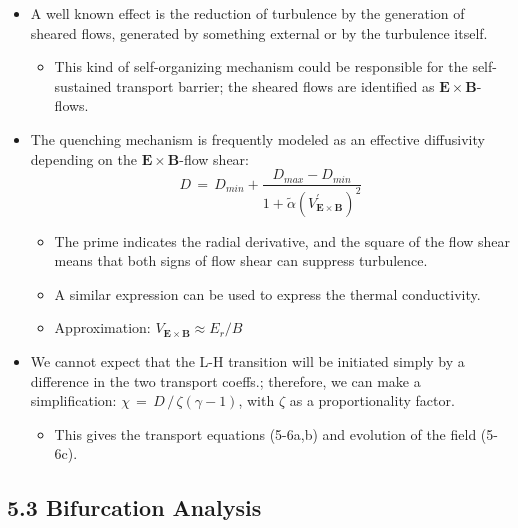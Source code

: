 \documentclass[a4paper]{article}
\begin{document}
\begin{itemize}
\item
  A well known effect is the reduction of turbulence by the generation
  of sheared flows, generated by something external or by the turbulence
  itself.

  \begin{itemize}
  \itemsep1pt\parskip0pt
  \item
    This kind of self-organizing mechanism could be responsible for the
    self-sustained transport barrier; the sheared flows are identified
    as $\mathbf{E}\times\mathbf{B}$-flows.
  \end{itemize}
\item
  The quenching mechanism is frequently modeled as an effective
  diffusivity depending on the $\mathbf{E}\times\mathbf{B}$-flow shear:
  \[D \,=\, D_{min} + \frac{D_{max} - D_{min}}{1 + \widetilde{\alpha}\left(V^\prime_{\mathbf{E}\times\mathbf{B}}\right)^2}\]

  \begin{itemize}
  \item
    The prime indicates the radial derivative, and the square of the
    flow shear means that both signs of flow shear can suppress
    turbulence.
  \item
    A similar expression can be used to express the thermal
    conductivity.
  \item
    Approximation: $V_{\mathbf{E}\times\mathbf{B}} \approx E_r / B$
  \end{itemize}
\item
  We cannot expect that the L-H transition will be initiated simply by a
  difference in the two transport coeffs.; therefore, we can make a
  simplification: $\chi \,=\, D \,/\, \zeta(\gamma - 1)$, with $\zeta$
  as a proportionality factor.

  \begin{itemize}
  \itemsep1pt\parskip0pt
  \item
    This gives the transport equations (5-6a,b) and evolution of the
    field (5-6c).
  \end{itemize}
\end{itemize}

\subsection{5.3 Bifurcation Analysis}\label{bifurcation-analysis}
\end{document}
